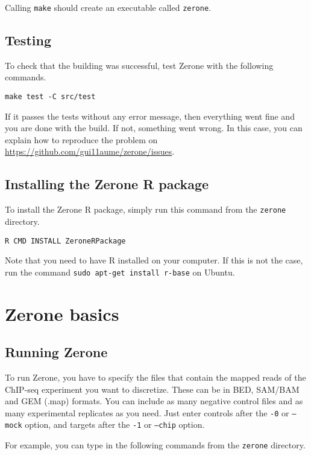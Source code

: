 \documentclass[12pt]{article}
\begin{document}
Calling \texttt{make} should create an executable called \texttt{zerone}.

\subsection{Testing}

To check that the building was successful, test Zerone with
the following commands.

\begin{verbatim}
make test -C src/test
\end{verbatim}

If it passes the tests without any error message, then everything went fine
and you are done with the build. If not, something went
wrong. In this case, you can explain how to reproduce the problem
on \url{https://github.com/gui11aume/zerone/issues}.

\subsection*{Installing the Zerone R package}

To install the Zerone R package, simply run this command from the
\texttt{zerone} directory.

\begin{verbatim}
R CMD INSTALL ZeroneRPackage
\end{verbatim}

Note that you need to have R installed on your computer. If this is not the
case, run the command \texttt{sudo apt-get install r-base} on Ubuntu.

\section{Zerone basics}

\subsection{Running Zerone}

To run Zerone, you have to specify the files that contain the mapped reads
of the ChIP-seq experiment you want to discretize. These can be in BED,
SAM/BAM and GEM (.map) formats. You can include as many negative control
files and as many experimental replicates as you need. Just enter controls
after the \texttt{-0} or \texttt{--mock} option, and targets
after the \texttt{-1} or \texttt{--chip} option.

For example, you can type in the following commands from the \texttt{zerone}
directory.
\end{document}
